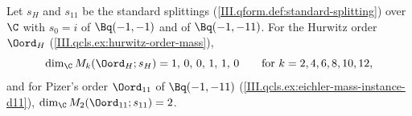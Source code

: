Let $s_H$ and $s_{11}$ be the standard splittings (\cref{III.qform.def:standard-splitting}) over $\C$ with $s_0=i$ of
$\Bq(-1,-1)$ and of $\Bq(-1,-11)$. For the Hurwitz order $\Oord_H$ (\cref{III.qcls.ex:hurwitz-order-mass}),
\[
  \dim_\C M_k(\Oord_H;s_H)=1,\,0,\,0,\,1,\,1,\,0\qquad\text{for }k=2,4,6,8,10,12,
\]
and for Pizer's order $\Oord_{11}$ of $\Bq(-1,-11)$ (\cref{III.qcls.ex:eichler-mass-instance-d11}), $\dim_\C M_2(\Oord_{11};s_{11})=2$.
